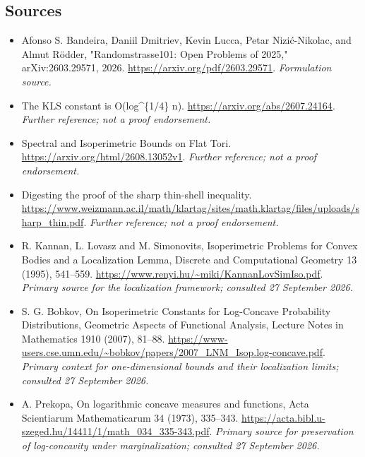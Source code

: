 \documentclass[11pt]{article}
\begin{document}
\subsection{Sources}
\begin{itemize}
\item[S1]Afonso S. Bandeira, Daniil Dmitriev, Kevin Lucca, Petar Nizić-Nikolac, and Almut Rödder, "Randomstrasse101: Open Problems of 2025," arXiv:2603.29571, 2026.
\url{https://arxiv.org/pdf/2603.29571}.
\textit{Formulation source.}
\item[S2]The KLS constant is O(log\textasciicircum{}\{1/4\} n).
\url{https://arxiv.org/abs/2607.24164}.
\textit{Further reference; not a proof endorsement.}
\item[S3]Spectral and Isoperimetric Bounds on Flat Tori.
\url{https://arxiv.org/html/2608.13052v1}.
\textit{Further reference; not a proof endorsement.}
\item[S4]Digesting the proof of the sharp thin-shell inequality.
\url{https://www.weizmann.ac.il/math/klartag/sites/math.klartag/files/uploads/sharp_thin.pdf}.
\textit{Further reference; not a proof endorsement.}
\item[E1]R. Kannan, L. Lovasz and M. Simonovits, Isoperimetric Problems for Convex Bodies and a Localization Lemma, Discrete and Computational Geometry 13 (1995), 541--559.
\url{https://www.renyi.hu/~miki/KannanLovSimIso.pdf}.
\textit{Primary source for the localization framework; consulted 27 September 2026.}
\item[E2]S. G. Bobkov, On Isoperimetric Constants for Log-Concave Probability Distributions, Geometric Aspects of Functional Analysis, Lecture Notes in Mathematics 1910 (2007), 81--88.
\url{https://www-users.cse.umn.edu/~bobkov/papers/2007_LNM_Isop.log-concave.pdf}.
\textit{Primary context for one-dimensional bounds and their localization limits; consulted 27 September 2026.}
\item[E3]A. Prekopa, On logarithmic concave measures and functions, Acta Scientiarum Mathematicarum 34 (1973), 335--343.
\url{https://acta.bibl.u-szeged.hu/14411/1/math_034_335-343.pdf}.
\textit{Primary source for preservation of log-concavity under marginalization; consulted 27 September 2026.}
\end{itemize}
\end{document}
